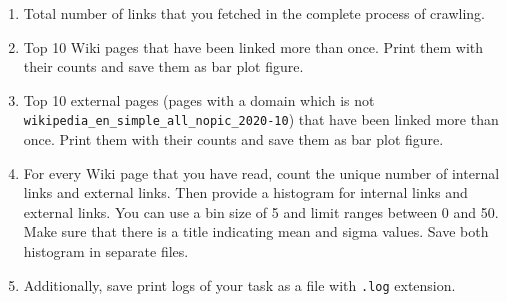 \documentclass{resources/WeSTassignment}
\begin{document}
\begin{enumerate}
\item Total number of links that you fetched in the complete process of crawling.
\item Top 10 Wiki pages that have been linked more than once. Print them with their counts and save them as bar plot figure.
\item Top 10 external pages (pages with a domain which is not \texttt{wikipedia\_en\_simple\_all\_nopic\_2020-10}) that have been linked more than once. Print them with their counts and save them as bar plot figure.
\item For every Wiki page that you have read, count the unique number of internal links and external links. Then provide a histogram for internal links and external links. You can use a bin size of 5 and limit ranges between 0 and 50. Make sure that there is a title indicating mean and sigma values. Save both histogram in separate files.
\item Additionally, save print logs of your task as a file with \texttt{.log} extension.
\end{enumerate}
\end{document}

